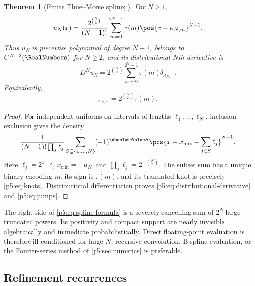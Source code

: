 \documentclass[11pt,oneside]{article}
\numberwithin{equation}{section}
\newtheorem{theorem}{Theorem}[section]
\theoremstyle{definition}
\theoremstyle{remark}
\begin{document}
\begin{theorem}[Finite Thue--Morse spline; \baseline]
For $N\ge1$,
\begin{equation}
 u_N(x)=\frac{2^{\binom N2}}{(N-1)!}
 \sum_{m=0}^{2^N-1}\tau(m)\pos{x-\kappa_{N,m}}^{N-1}.
 \label{p5:eq:spline-formula}
\end{equation}
Thus $u_N$ is piecewise polynomial of degree $N-1$, belongs to $C^{N-2}(\RealNumbers)$ for $N\ge2$, and its distributional $N$th derivative is
\begin{equation}
 D^Nu_N=2^{\binom N2}\sum_{m=0}^{2^N-1}\tau(m)\delta_{\kappa_{N,m}}.
 \label{p5:eq:distributional-derivative}
\end{equation}
Equivalently,
\begin{equation}
 [u_N^{(N-1)}]_{\kappa_{N,m}}
 =2^{\binom N2}\tau(m).
 \label{p5:eq:jumps}
\end{equation}
\end{theorem}

\begin{proof}
For independent uniforms on intervals of lengths $\ell_1,\ldots,\ell_N$, inclusion--exclusion gives the density
\[
 \frac1{(N-1)!\prod_j\ell_j}
 \sum_{S\subseteq\{1,\ldots,N\}}(-1)^{\AbsoluteValue S}
 \pos{x-x_{\min}-\sum_{j\in S}\ell_j}^{N-1}.
\]
Here $\ell_j=2^{1-j}$, $x_{\min}=-a_N$, and
$\prod_j\ell_j=2^{-\binom N2}$.  The subset sum has a unique binary encoding $m$, its sign is $\tau(m)$, and its translated knot is precisely \eqref{p5:eq:knots}.  Distributional differentiation proves \eqref{p5:eq:distributional-derivative} and \eqref{p5:eq:jumps}.
\end{proof}

\begin{remark}
The right side of \eqref{p5:eq:spline-formula} is a severely cancelling sum of $2^N$ large truncated powers.  Its positivity and compact support are nearly invisible algebraically and immediate probabilistically.  Direct floating-point evaluation is therefore ill-conditioned for large $N$; recursive convolution, B-spline evaluation, or the Fourier-series method of \cref{p5:sec:numerics} is preferable.
\end{remark}

\subsection{Refinement recurrences}
\end{document}
